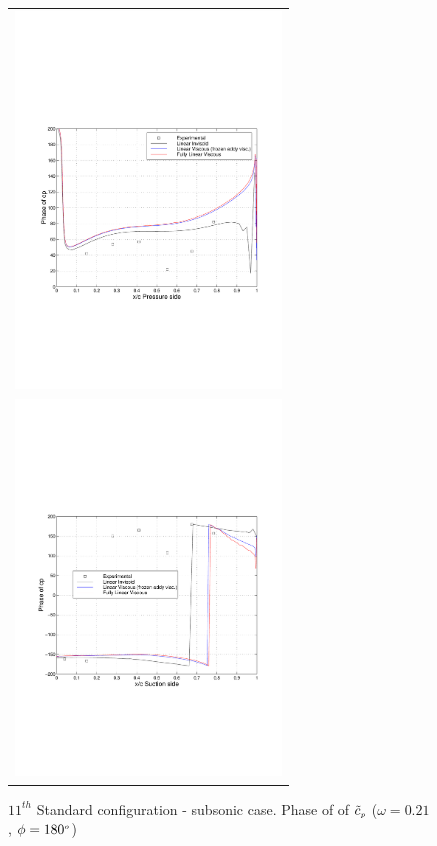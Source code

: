 %
\begin{figure}
 \begin{center}
  \begin{tabular}{c}
    {\includegraphics[height=100mm,clip=t]{CHAP_LINEAR/FIGURE/unsteady_blade_069_180_3.pdf}}\\
    {\includegraphics[height=100mm,clip=t]{CHAP_LINEAR/FIGURE/unsteady_blade_069_180_4.pdf}}
  \end{tabular}
 \end{center}
 \vspace{-7mm}
 \caption{$11^{th}$ Standard configuration - subsonic case.
          Phase of of $\tilde{c}_{\mbox{\tiny $p$}}$
         ($\omega = 0.21$, $\phi = 180^{\mbox{\tiny $o$}}$)}
 \label{subsonic_11_phas.fig}
\end{figure}
